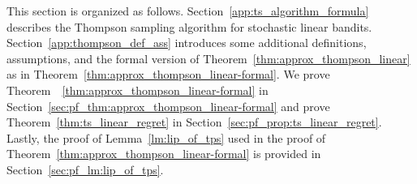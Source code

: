 This section is organized as follows. Section~\ref{app:ts_algorithm_formula} describes the Thompson sampling algorithm for stochastic linear bandits. Section~\ref{app:thompson_def_ass} introduces some additional definitions, assumptions, and the formal version of Theorem~\ref{thm:approx_thompson_linear} as in Theorem~\ref{thm:approx_thompson_linear-formal}.
We prove Theorem~~\ref{thm:approx_thompson_linear-formal} in Section~\ref{sec:pf_thm:approx_thompson_linear-formal} and prove Theorem~\ref{thm:ts_linear_regret} in Section~\ref{sec:pf_prop:ts_linear_regret}. Lastly, the proof of Lemma~\ref{lm:lip_of_tps} used in the proof of Theorem~\ref{thm:approx_thompson_linear-formal} is provided in Section~\ref{sec:pf_lm:lip_of_tps}.



